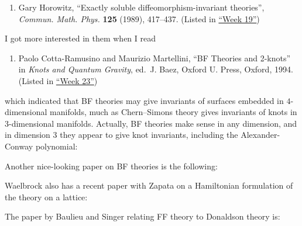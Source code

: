 \documentclass[12pt]{article}
\def\tightlist{}
\renewcommand{\texttt}[1]{%
  \begingroup
  \ttfamily
  \begingroup\lccode`~=`/\lowercase{\endgroup\def~}{/\discretionary{}{}{}}%
  \begingroup\lccode`~=`[\lowercase{\endgroup\def~}{[\discretionary{}{}{}}%
  \begingroup\lccode`~=`.\lowercase{\endgroup\def~}{.\discretionary{}{}{}}%
  \catcode`/=\active\catcode`[=\active\catcode`.=\active
  \scantokens{#1\noexpand}%
  \endgroup
}
\begin{document}
\begin{enumerate}
\def\labelenumi{\arabic{enumi})}
\tightlist
\item
Gary Horowitz, ``Exactly soluble diffeomorphism-invariant theories'',
\emph{Commun. Math. Phys.} \textbf{125} (1989), 417--437. (Listed in
\protect\hyperlink{week19}{``Week 19''})
\end{enumerate}
\noindent
I got more interested in them when I read

\begin{enumerate}
\def\labelenumi{\arabic{enumi})}
\setcounter{enumi}{1}
\tightlist
\item
Paolo Cotta-Ramusino and Maurizio
Martellini, ``BF Theories and 2-knots'' in \emph{Knots and Quantum Gravity}, ed.~J. Baez,
Oxford U. Press, Oxford, 1994.  (Listed in \protect\hyperlink{week23}{``Week 23''})
\end{enumerate}
\noindent
which indicated that BF theories may give invariants of surfaces
embedded in \(4\)-dimensional manifolds, much as Chern--Simons theory
gives invariants of knots in \(3\)-dimensional manifolds. Actually, BF
theories make sense in any dimension, and in dimension 3 they appear to
give knot invariants, including the Alexander-Conway polynomial:

\noindent
Another nice-looking paper on BF theories is the following:

\noindent
Waelbrock also has a recent paper with Zapata on a Hamiltonian
formulation of the theory on a lattice:

\noindent
The paper by Baulieu and Singer relating FF theory to Donaldson theory
is:
\end{document}
